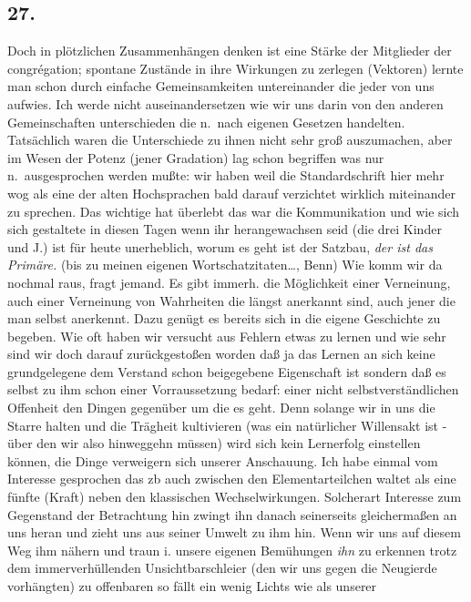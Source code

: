\documentclass[
]{article}
\author{}
\date{\vspace{-2.5em}}
\begin{document}
\subsection{27.}\label{section}

Doch in plötzlichen Zusammenhängen denken ist eine Stärke der Mitglieder
der congrégation; spontane Zustände in ihre Wirkungen zu zerlegen
(Vektoren) lernte man schon durch einfache Gemeinsamkeiten untereinander
die jeder von uns aufwies. Ich werde nicht auseinandersetzen wie wir uns
darin von den anderen Gemeinschaften unterschieden die n.~nach eigenen
Gesetzen handelten. Tatsächlich waren die Unterschiede zu ihnen nicht
sehr groß auszumachen, aber im Wesen der Potenz (jener Gradation) lag
schon begriffen was nur n.~ausgesprochen werden mußte: wir haben weil
die Standardschrift hier mehr wog als eine der alten Hochsprachen bald
darauf verzichtet wirklich miteinander zu sprechen. Das wichtige hat
überlebt das war die Kommunikation und wie sich sich gestaltete in
diesen Tagen wenn ihr herangewachsen seid (die drei Kinder und J.) ist
für heute unerheblich, worum es geht ist der Satzbau, \emph{der ist das
Primäre.} (bis zu meinen eigenen Wortschatzitaten\ldots, Benn) Wie komm
wir da nochmal raus, fragt jemand. Es gibt immerh. die Möglichkeit einer
Verneinung, auch einer Verneinung von Wahrheiten die längst anerkannt
sind, auch jener die man selbst anerkennt. Dazu genügt es bereits sich
in die eigene Geschichte zu begeben. Wie oft haben wir versucht aus
Fehlern etwas zu lernen und wie sehr sind wir doch darauf zurückgestoßen
worden daß ja das Lernen an sich keine grundgelegene dem Verstand schon
beigegebene Eigenschaft ist sondern daß es selbst zu ihm schon einer
Vorraussetzung bedarf: einer nicht selbstverständlichen Offenheit den
Dingen gegenüber um die es geht. Denn solange wir in uns die Starre
halten und die Trägheit kultivieren (was ein natürlicher Willensakt ist
- über den wir also hinweggehn müssen) wird sich kein Lernerfolg
einstellen können, die Dinge verweigern sich unserer Anschauung. Ich
habe einmal vom Interesse gesprochen das zb auch zwischen den
Elementarteilchen waltet als eine fünfte (Kraft) neben den klassischen
Wechselwirkungen. Solcherart Interesse zum Gegenstand der Betrachtung
hin zwingt ihn danach seinerseits gleichermaßen an uns heran und zieht
uns aus seiner Umwelt zu ihm hin. Wenn wir uns auf diesem Weg ihm nähern
und traun i. unsere eigenen Bemühungen \emph{ihn} zu erkennen trotz dem
immerverhüllenden Unsichtbarschleier (den wir uns gegen die Neugierde
vorhängten) zu offenbaren so fällt ein wenig Lichts wie als unserer
\end{document}
